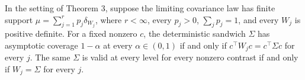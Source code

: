 In the setting of Theorem 3, suppose the limiting covariance law has finite support \(\mu=\sum_{j=1}^r p_j\delta_{W_j}\), where \(r<\infty\), every \(p_j>0\), \(\sum_jp_j=1\), and every \(W_j\) is positive definite. For a fixed nonzero \(c\), the deterministic sandwich \(\Sigma\) has asymptotic coverage \(1-\alpha\) at every \(\alpha\in(0,1)\) if and only if \(c^\top W_jc=c^\top\Sigma c\) for every \(j\). The same \(\Sigma\) is valid at every level for every nonzero contrast if and only if \(W_j=\Sigma\) for every \(j\).